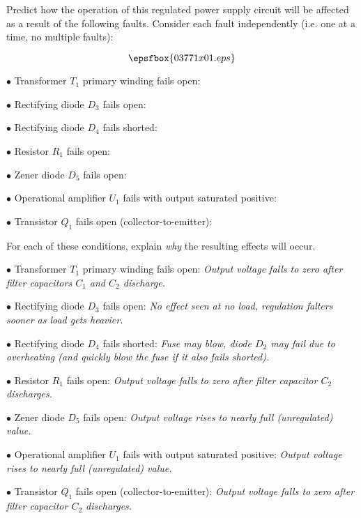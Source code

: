 

Predict how the operation of this regulated power supply circuit will be affected as a result of the following faults.  Consider each fault independently (i.e. one at a time, no multiple faults):

$$\epsfbox{03771x01.eps}$$

\medskip
\item{$\bullet$} Transformer $T_1$ primary winding fails open:
\vskip 5pt
\item{$\bullet$} Rectifying diode $D_3$ fails open:
\vskip 5pt
\item{$\bullet$} Rectifying diode $D_4$ fails shorted:
\vskip 5pt
\item{$\bullet$} Resistor $R_1$ fails open:
\vskip 5pt
\item{$\bullet$} Zener diode $D_5$ fails open:
\vskip 5pt
\item{$\bullet$} Operational amplifier $U_1$ fails with output saturated positive:
\vskip 5pt
\item{$\bullet$} Transistor $Q_1$ fails open (collector-to-emitter):
\medskip

For each of these conditions, explain {\it why} the resulting effects will occur.







\medskip
\item{$\bullet$} Transformer $T_1$ primary winding fails open: {\it Output voltage falls to zero after filter capacitors $C_1$ and $C_2$ discharge.}
\vskip 5pt
\item{$\bullet$} Rectifying diode $D_3$ fails open: {\it No effect seen at no load, regulation falters sooner as load gets heavier.}
\vskip 5pt
\item{$\bullet$} Rectifying diode $D_4$ fails shorted: {\it Fuse may blow, diode $D_2$ may fail due to overheating (and quickly blow the fuse if it also fails shorted).}
\vskip 5pt
\item{$\bullet$} Resistor $R_1$ fails open: {\it Output voltage falls to zero after filter capacitor $C_2$ discharges.}
\vskip 5pt
\item{$\bullet$} Zener diode $D_5$ fails open: {\it Output voltage rises to nearly full (unregulated) value.}
\vskip 5pt
\item{$\bullet$} Operational amplifier $U_1$ fails with output saturated positive: {\it Output voltage rises to nearly full (unregulated) value.}
\vskip 5pt
\item{$\bullet$} Transistor $Q_1$ fails open (collector-to-emitter): {\it Output voltage falls to zero after filter capacitor $C_2$ discharges.}
\medskip

